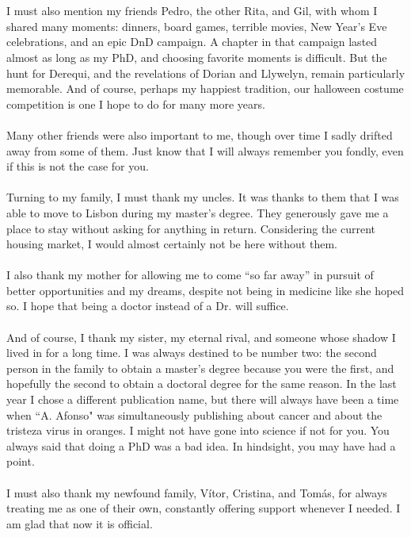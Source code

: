 \\
\\
I must also mention my friends Pedro, the other Rita, and Gil, with whom I shared many moments: dinners, board games, terrible movies, New Year's Eve celebrations, and an epic DnD campaign. A chapter in that campaign lasted almost as long as my PhD, and choosing favorite moments is difficult. But the hunt for Derequi, and the revelations of Dorian and Llywelyn, remain particularly memorable. And of course, perhaps my happiest tradition, our halloween costume competition is one I hope to do for many more years.
\\
\\
Many other friends were also important to me, though over time I sadly drifted away from some of them. Just know that I will always remember you fondly, even if this is not the case for you.
\\
\\
Turning to my family, I must thank my uncles. It was thanks to them that I was able to move to Lisbon during my master's degree. They generously gave me a place to stay without asking for anything in return. Considering the current housing market, I would almost certainly not be here without them.
\\
\\
I also thank my mother for allowing me to come “so far away” in pursuit of better opportunities and my dreams, despite not being in medicine like she hoped so. I hope that being a doctor instead of a Dr. will suffice. 
\\
\\
And of course, I thank my sister, my eternal rival, and someone whose shadow I lived in for a long time. I was always destined to be number two: the second person in the family to obtain a master’s degree because you were the first, and hopefully the second to obtain a doctoral degree for the same reason. In the last year I chose a different publication name, but there will always have been a time when “A. Afonso" was simultaneously publishing about cancer and about the tristeza virus in oranges. I might not have gone into science if not for you. You always said that doing a PhD was a bad idea. In hindsight, you may have had a point.
\\
\\
I must also thank my newfound family, Vítor, Cristina, and Tomás, for always treating me as one of their own, constantly offering support whenever I needed. I am glad that now it is official.
\\
